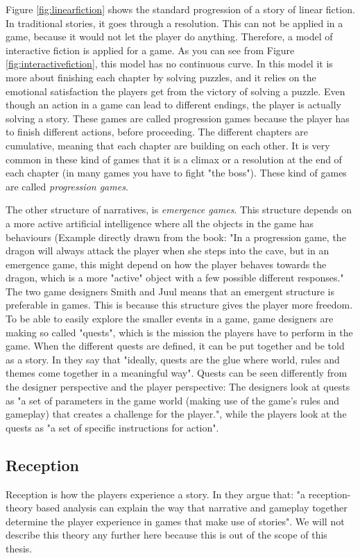 Figure \ref{fig:linearfiction} shows the standard progression of a story of linear fiction. In traditional stories, it goes through a resolution. This can not be applied in a game, because it would not let the player do anything. Therefore, a model of interactive fiction is applied for a game. As you can see from Figure \ref{fig:interactivefiction}, this model has no continuous curve. In this model it is more about finishing each chapter by solving puzzles, and it relies on the emotional satisfaction the players get from the victory of solving a puzzle. Even though an action in a game can lead to different endings, the player is actually solving a story. These games are called progression games because the player has to finish different actions, before proceeding. The different chapters are cumulative, meaning that each chapter are building on each other. It is very common in these kind of games that it is a climax or a resolution at the end of each chapter (in many games you have to fight "the boss"). These kind of games are called \emph{progression games}. 

The other structure of narratives, is \emph{emergence games}. This structure depends on a more active artificial intelligence where all the objects in the game has behaviours (Example directly drawn from the book: "In a progression game, the dragon will always attack the player when she steps into the cave, but in an emergence game, this might depend on how the player behaves towards the dragon, which is a more "active" object with a few possible different responses." The two game designers Smith and Juul means that an emergent structure is preferable in games. This is because this structure gives the player more freedom. To be able to easily explore the smaller events in a game, game designers are making so called "quests", which is the mission the players have to perform in the game. When the different quests are defined, it can be put together and be told as a story. In \cite{understandingvg} they say that "ideally, quests are the glue where world, rules and themes come together in a meaningful way". Quests can be seen differently from the designer perspective and the player perspective: The designers look at quests as "a set of parameters in the game world (making use of the game’s rules and gameplay) that creates a challenge for the player.", while the players look at the quests as "a set of specific instructions for action". 

\subsection{Reception}
Reception is how the players experience a story. In \cite{understandingvg} they argue that: "a reception-theory based analysis can explain the way that narrative and gameplay together determine the player experience in games that make use of stories". We will not describe this theory any further here because this is out of the scope of this thesis.

